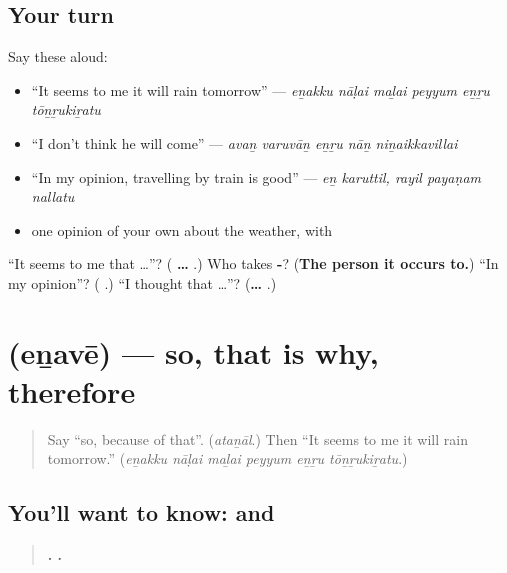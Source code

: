 \subsection*{Your turn}
Say these aloud:

\begin{itemize}
\raggedright
  \item \textquotedblleft{}It seems to me it will rain tomorrow\textquotedblright{} — \emph{eṉakku nāḷai maḻai peyyum eṉṟu tōṉṟukiṟatu}
  \item \textquotedblleft{}I don't think he will come\textquotedblright{} — \emph{avaṉ varuvāṉ eṉṟu nāṉ niṉaikkavillai}
  \item \textquotedblleft{}In my opinion, travelling by train is good\textquotedblright{} — \emph{eṉ karuttil, rayil payaṇam nallatu}
  \item one opinion of your own about the weather, with 
\end{itemize}

\begin{tcolorbox}[breakable,colback=teal!4,colframe=teal!35!black,title={Before you move on}]
\textquotedblleft{}It seems to me that …\textquotedblright{}? (\textbf{ …  }.) Who takes \textbf{-}? (\textbf{The person it occurs to.}) \textquotedblleft{}In my opinion\textquotedblright{}? (\textbf{ }.) \textquotedblleft{}I thought that …\textquotedblright{}? (\textbf{…  }.)
\end{tcolorbox}
\section[\texorpdfstring{\ta{எனவே} (eṉavē)}{எனவே (eṉavē)}]{ (eṉavē) — so, that is why, therefore}

\label{lesson:TA-C286-enave}



\begin{quote}
Say \textquotedblleft{}so, because of that\textquotedblright{}. (\emph{ataṉāl}.) Then \textquotedblleft{}It seems to me it will rain tomorrow.\textquotedblright{} (\emph{eṉakku nāḷai maḻai peyyum eṉṟu tōṉṟukiṟatu}.)
\end{quote}

\subsection*{You'll want to know:  and }
\begin{quote}
\textbf{  .    .}
\end{quote}

